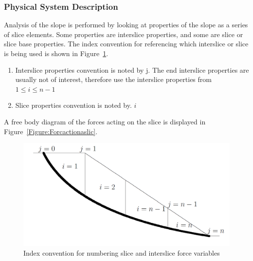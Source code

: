\documentclass[12pt]{article}
\begin{document}
\subsubsection{Physical System Description}
\label{Sec:PhysSystDesc}
Analysis of the slope is performed by looking at properties of the slope as a series of slice elements. Some properties are interslice properties, and some are slice or slice base properties. The index convention for referencing which interslice or slice is being used is shown in Figure~\ref{Figure:Indeconvfornumbslicandinteforcvaris}.
\begin{enumerate}
\item{Interslice properties convention is noted by j. The end interslice properties are usually not of interest, therefore use the interslice properties from $1\leq{}i\leq{}n-1$}
\item{Slice properties convention is noted by. $i$}
\end{enumerate}
A free body diagram of the forces acting on the slice is displayed in Figure~\ref{Figure:Forcactionaslic}.
\begin{figure}
\begin{center}
\includegraphics[width=\textwidth]{IndexConvention.png}
\caption{Index convention for numbering slice and interslice force variables}
\label{Figure:Indeconvfornumbslicandinteforcvaris}
\end{center}
\end{figure}
\end{document}
